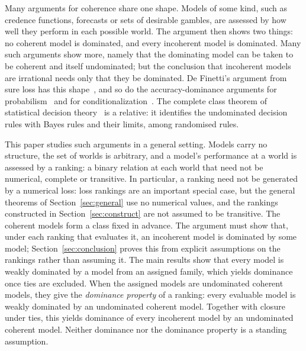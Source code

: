 \documentclass[11pt]{article}
\theoremstyle{definition}
\theoremstyle{remark}
\begin{document}
Many arguments for coherence share one shape. Models of some kind, such as credence functions, forecasts or sets of desirable gambles, are assessed by how well they perform in each possible world. The argument then shows two things: no coherent model is dominated, and every incoherent model is dominated. Many such arguments show more, namely that the dominating model can be taken to be coherent and itself undominated; but the conclusion that incoherent models are irrational needs only that they be dominated. De Finetti's argument from sure loss has this shape~\cite{deFinetti}, and so do the accuracy-dominance arguments for probabilism~\cite{Joyce,Predd,SSK09,Pettigrew,Nielsen} and for conditionalization~\cite{BP20,Nielsen21}. The complete class theorem of statistical decision theory~\cite{Wald} is a relative: it identifies the undominated decision rules with Bayes rules and their limits, among randomised rules.

This paper studies such arguments in a general setting. Models carry no structure, the set of worlds is arbitrary, and a model's performance at a world is assessed by a ranking: a binary relation at each world that need not be numerical, complete or transitive. In particular, a ranking need not be generated by a numerical loss: loss rankings are an important special case, but the general theorems of Section~\ref{sec:general} use no numerical values, and the rankings constructed in Section~\ref{sec:construct} are not assumed to be transitive. The coherent models form a class fixed in advance. The argument must show that, under each ranking that evaluates it, an incoherent model is dominated by some model; Section~\ref{sec:conclusion} proves this from explicit assumptions on the rankings rather than assuming it. The main results show that every model is weakly dominated by a model from an assigned family, which yields dominance once ties are excluded. When the assigned models are undominated coherent models, they give the \emph{dominance property} of a ranking: every evaluable model is weakly dominated by an undominated coherent model. Together with closure under ties, this yields dominance of every incoherent model by an undominated coherent model. Neither dominance nor the dominance property is a standing assumption.
\end{document}
